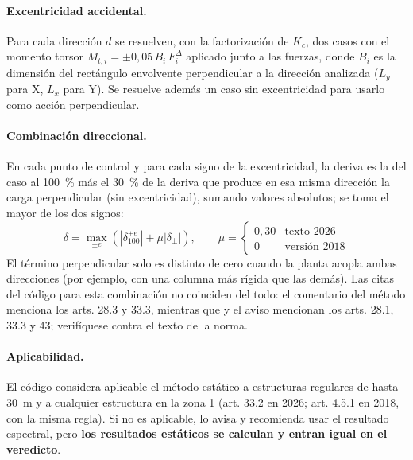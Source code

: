 \paragraph{Excentricidad accidental.} Para cada dirección $d$ se resuelven, con la factorización de $K_c$, dos casos con
el momento torsor $M_{t,i} = \pm 0{,}05\,B_i\,F^{\Delta}_i$ aplicado junto a las fuerzas, donde $B_i$ es la dimensión del
rectángulo envolvente perpendicular a la dirección analizada ($L_y$ para X, $L_x$ para Y). Se resuelve además un caso sin
excentricidad para usarlo como acción perpendicular.

\paragraph{Combinación direccional.} En cada punto de control y para cada signo de la excentricidad, la deriva es la del
caso al 100~\% más el 30~\% de la deriva que produce en esa misma dirección la carga perpendicular (sin excentricidad),
sumando valores absolutos; se toma el mayor de los dos signos:
\begin{equation}
	\delta = \max_{\pm e}\left( \left|\delta_{100}^{\pm e}\right| + \mu \left|\delta_{\perp}\right| \right),
	\qquad \mu = \begin{cases} 0{,}30 & \text{texto 2026} \\ 0 & \text{versión 2018} \end{cases}
	\label{eq:sis-combinacion-estatica}
\end{equation}
El término perpendicular solo es distinto de cero cuando la planta acopla ambas direcciones (por ejemplo, con una columna
más rígida que las demás). Las citas del código para esta combinación no coinciden del todo: el comentario del método
 menciona los arts. 28.3 y 33.3, mientras que  y el aviso mencionan los
arts. 28.1, 33.3 y 43; verifíquese contra el texto de la norma.

\paragraph{Aplicabilidad.} El código considera aplicable el método estático a estructuras regulares de hasta 30~m y a
cualquier estructura en la zona 1 (art. 33.2 en 2026; art. 4.5.1 en 2018, con la misma regla). Si no es aplicable, lo
avisa y recomienda usar el resultado espectral, pero \textbf{los resultados estáticos se calculan y entran igual en el
veredicto}.

